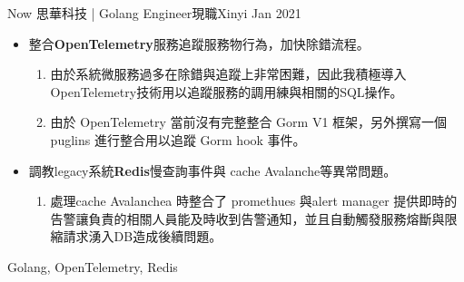 %
%
%



\begin{experiences}
	\experience
	{Now}   {思華科技 | Golang Engineer}{現職}{Xinyi}
	{Jan 2021} {
                      \begin{itemize}
                      	\item 整合\textbf{OpenTelemetry}服務追蹤服務物行為，加快除錯流程。
                      		\begin{enumerate}                      	
                      			\item 由於系統微服務過多在除錯與追蹤上非常困難，因此我積極導入OpenTelemetry技術用以追蹤服務的調用練與相關的SQL操作。
                      			\item 由於 OpenTelemetry 當前沒有完整整合 Gorm  V1 框架，另外撰寫一個 puglins  進行整合用以追蹤  Gorm hook 事件。
                      		 \end{enumerate}
                      	\item 調教legacy系統\textbf{Redis}慢查詢事件與 cache Avalanche等異常問題。
	                      	\begin{enumerate}
        	              		\item 處理cache Avalanchea 時整合了  promethues  與alert manager 提供即時的告警讓負責的相關人員能及時收到告警通知，並且自動觸發服務熔斷與限縮請求湧入DB造成後續問題。
                      		\end{enumerate}
                      	\end{itemize}
                     }
                 {Golang, OpenTelemetry, Redis}
	\emptySeparator
	


\end{experiences}

